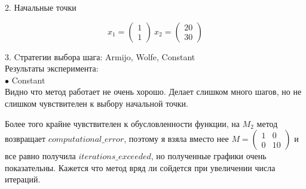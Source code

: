 \documentclass{article}
\theoremstyle{definition}
\theoremstyle{remark}
\begin{document}
2. Начальные точки

$$
x_1 =
\begin{pmatrix}
1 \\
1
\end{pmatrix}\ x_2 =
\begin{pmatrix}
20 \\
30
\end{pmatrix}
$$

3. Cтратегии выбора шага: Armijo, Wolfe, Constant\\


Результаты эксперимента:\\


$\bullet$ Constant\\

Видно что метод работает не очень хорошо. Делает слишком много шагов, но не слишком чувствителен к выбору начальной точки.

Более того крайне чувствителен к обусловленности функции, на $M_2$ метод возвращает $computational\_error$, поэтому я взяла вместо нее
$
M =\begin{pmatrix}1 &	0\\ 0 &	10
\end{pmatrix}
$
и все равно получила $iterations\_exceeded$, но полученные графики очень показательны. Кажется что метод вряд ли сойдется при увеличении числа итераций.
\end{document}
